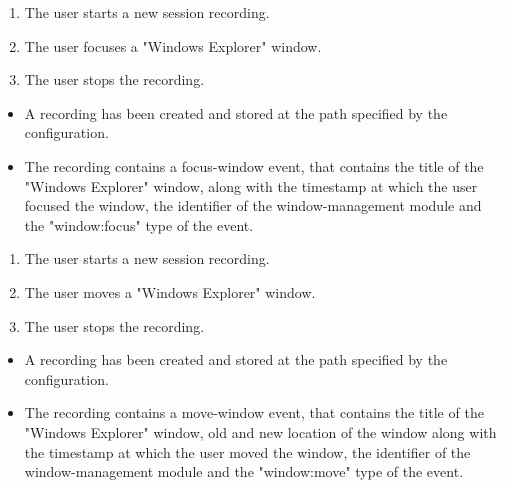 \begin{tests}
	{\begin{enumerate}
		\item The \gls{user} starts a new session recording.
		\item The \gls{user} focuses a "Windows Explorer" window.
		\item The \gls{user} stops the recording.
	\end{enumerate}}
	{\begin{itemize}
		\item A recording has been created and stored at the path specified by the configuration.
		\item The recording contains a focus-window event, that contains the title of the "Windows Explorer" window, along with the timestamp at which the user focused the window, the identifier of the window-management module and the "window:focus" type of the event.
	\end{itemize}}
	
	{\begin{enumerate}
		\item The \gls{user} starts a new session recording.
		\item The \gls{user} moves a "Windows Explorer" window.
		\item The \gls{user} stops the recording.
	\end{enumerate}}
	{\begin{itemize}
		\item A recording has been created and stored at the path specified by the configuration.
		\item The recording contains a move-window event, that contains the title of the "Windows Explorer" window, old and new location of the window along with the timestamp at which the user moved the window, the identifier of the window-management module and the "window:move" type of the event.
	\end{itemize}}
	

\end{tests}
